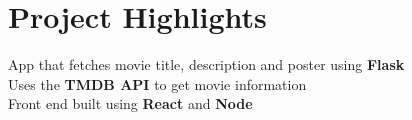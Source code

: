 \documentclass[]{Nikhil_Kadiyan_Resume}
\begin{document}

\section{Project Highlights}
\hrulefill



\pt App that fetches movie title, description and poster using \textbf{Flask} \\
\pt Uses the \textbf{TMDB API} to get movie information\\
\pt Front end built using \textbf{React} and \textbf{Node}\\
\sectionsep
\end{document}
